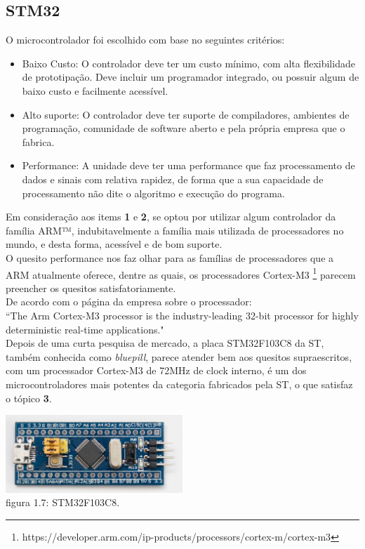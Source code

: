 \documentclass[11pt,a4paper]{report}
\begin{document}
	\subsection{STM32}
	O microcontrolador foi escolhido com base no seguintes critérios:
	
	\begin{itemize}
		\item[{\bf 1.)}]Baixo Custo: O controlador deve ter um custo mínimo, com alta flexibilidade de prototipação. Deve incluir um programador integrado, ou possuir algum de baixo custo e facilmente acessível.
		
		\item[{\bf 2.)}]Alto suporte: O controlador deve ter suporte de compiladores, ambientes de programação, comunidade de software aberto e pela própria empresa que o fabrica.
		
		\item[{\bf 3.)}]Performance: A unidade deve ter uma performance que faz processamento de dados e sinais com relativa rapidez, de forma que a sua capacidade de processamento não dite o algoritmo e execução do programa.
	
	\end{itemize}

	Em consideração aos items {\bf 1} e {\bf 2}, se optou por utilizar algum controlador da família ARM™, indubitavelmente a família mais utilizada de processadores no mundo, e desta forma, acessível e de bom suporte. \\
	
	O quesito performance nos faz olhar para as famílias de processadores que a ARM atualmente oferece, dentre as quais, os processadores Cortex-M3 \footnote{https://developer.arm.com/ip-products/processors/cortex-m/cortex-m3} parecem preencher os quesitos satisfatoriamente. \\
	
	De acordo com o página da empresa sobre o processador:\\
	
	``The Arm Cortex-M3 processor is the industry-leading 32-bit processor for highly deterministic real-time applications."\\
	
	Depois de uma curta pesquisa de mercado, a placa STM32F103C8 da ST, também conhecida como {\it bluepill}, parece atender bem aos quesitos supraescritos, com um processador Cortex-M3 de 72MHz de clock interno, é um dos microcontroladores mais potentes da categoria fabricados pela ST, o que satisfaz o tópico {\bf 3}.\\
	\begin{center}
		\includegraphics[width=0.5\textwidth]{bluepill}\\
		\footnotesize{figura 1.7: STM32F103C8.}
	\end{center}
\end{document}
